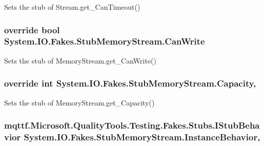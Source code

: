 Sets the stub of Stream.\-get\-\_\-\-Can\-Timeout()

\hypertarget{class_system_1_1_i_o_1_1_fakes_1_1_stub_memory_stream_a90826956a12744d8a76a43909428bff8}{
\subsubsection[{Can\-Write}]{\setlength{\rightskip}{0pt plus 5cm}override bool System.\-I\-O.\-Fakes.\-Stub\-Memory\-Stream.\-Can\-Write\hspace{0.3cm}{\ttfamily [get]}}}\label{class_system_1_1_i_o_1_1_fakes_1_1_stub_memory_stream_a90826956a12744d8a76a43909428bff8}


Sets the stub of Memory\-Stream.\-get\-\_\-\-Can\-Write()

\hypertarget{class_system_1_1_i_o_1_1_fakes_1_1_stub_memory_stream_aee62f3d23d2702c7759150b915cfe225}{
\subsubsection[{Capacity}]{\setlength{\rightskip}{0pt plus 5cm}override int System.\-I\-O.\-Fakes.\-Stub\-Memory\-Stream.\-Capacity\hspace{0.3cm}{\ttfamily [get]}, {\ttfamily [set]}}}\label{class_system_1_1_i_o_1_1_fakes_1_1_stub_memory_stream_aee62f3d23d2702c7759150b915cfe225}


Sets the stub of Memory\-Stream.\-get\-\_\-\-Capacity()

\hypertarget{class_system_1_1_i_o_1_1_fakes_1_1_stub_memory_stream_a3c0fdc6b6e27afa0e0cf0e4cb9e9bbdb}{
\subsubsection[{Instance\-Behavior}]{\setlength{\rightskip}{0pt plus 5cm}mqttf.\-Microsoft.\-Quality\-Tools.\-Testing.\-Fakes.\-Stubs.\-I\-Stub\-Behavior System.\-I\-O.\-Fakes.\-Stub\-Memory\-Stream.\-Instance\-Behavior\hspace{0.3cm}{\ttfamily [get]}, {\ttfamily [set]}}}\label{class_system_1_1_i_o_1_1_fakes_1_1_stub_memory_stream_a3c0fdc6b6e27afa0e0cf0e4cb9e9bbdb}


